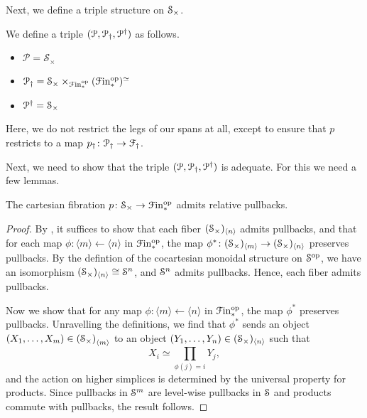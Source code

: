 \documentclass[main.tex]{subfiles}
\begin{document}
Next, we define a triple structure on $\S_{\times}$.

\begin{definition}
  We define a triple $\triple{P}$ as follows.
  \begin{itemize}
    \item $\mathcal{P} = \mathcal{S}_{\times}$

    \item $\mathcal{P}\downdag = \mathcal{S}_{\times} \times_{\Finp\op} (\Finp\op)^{\simeq}$

    \item $\mathcal{P}\updag = \mathcal{S}_{\times}$
  \end{itemize}
\end{definition}

Here, we do not restrict the legs of our spans at all, except to ensure that $p$ restricts to a map $p\downdag\colon \category{P}\downdag \to \category{F}\downdag$.

Next, we need to show that the triple $\triple{P}$ is adequate. For this we need a few lemmas.

\begin{lemma}
  \label{lemma:spaces_fibration_admits_relative_pullbacks}
  The cartesian fibration $p\colon \S_{\times} \to \Finp\op$ admits relative pullbacks.
\end{lemma}
\begin{proof}
  By \cite[Cor.\ 4.3.1.11]{highertopostheory}, it suffices to show that each fiber $(\S_{\times})_{\langle n \rangle}$ admits pullbacks, and that for each map $\phi\colon \langle m \rangle \leftarrow \langle n \rangle$ in $\Finp\op$, the map $\phi^{*}\colon (\S_{\times})_{\langle m \rangle} \to (\S_{\times})_{\langle n \rangle}$ preserves pullbacks. By the defintion of the cocartesian monoidal structure on $\S\op$, we have an isomorphism  $(\S_{\times})_{\langle n \rangle} \cong \S^{n}$, and $\S^{n}$ admits pullbacks. Hence, each fiber admits pullbacks.

  Now we show that for any map $\phi\colon \langle m \rangle \leftarrow \langle n \rangle$ in $\Finp\op$, the map $\phi^{*}$ preserves pullbacks. Unravelling the definitions, we find that $\phi^{*}$ sends an object $(X_{1}, \ldots, X_{m}) \in \left( \S_{\times} \right)_{\langle m \rangle}$ to an object $(Y_{1}, \ldots, Y_{n}) \in (\S_{\times})_{\langle n \rangle}$ such that
  \begin{equation*}
    X_{i} \simeq \prod_{\phi(j) = i} Y_{j},
  \end{equation*}
  and the action on higher simplices is determined by the universal property for products. Since pullbacks in $\S^{m}$ are level-wise pullbacks in $\S$ and products commute with pullbacks, the result follows.
\end{proof}
\end{document}
